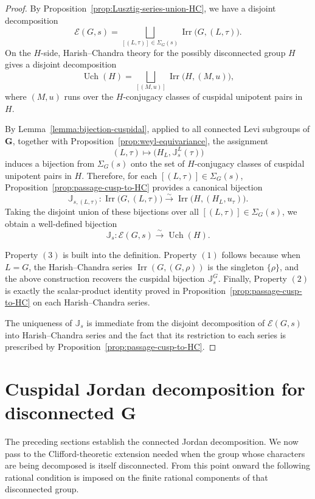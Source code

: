 \documentclass{amsart}
\theoremstyle{plain}
\numberwithin{equation}{section}
\theoremstyle{definition}
\newcommand{\cE}{\mathcal{E}}
\newcommand{\Irr}{\operatorname{Irr}}
\newcommand{\Uch}{\operatorname{Uch}}
\newcommand{\J}{\mathbb{J}}
\newcommand{\bG}{\mathbf{G}}
\begin{document}
\begin{proof}
By Proposition~\ref{prop:Lusztig-series-union-HC}, we have a disjoint decomposition
\[
\cE(G,s)
=
\bigsqcup_{[(L,\tau)]\in \Sigma_G(s)}
\Irr\bigl(G,(L,\tau)\bigr).
\]
On the \(H\)-side, Harish--Chandra theory for the possibly disconnected group \(H\)
gives a disjoint decomposition
\[
\Uch(H)
=
\bigsqcup_{[(M,u)]}
\Irr\bigl(H,(M,u)\bigr),
\]
where \((M,u)\) runs over the \(H\)-conjugacy classes of cuspidal unipotent pairs in
\(H\).

By Lemma~\ref{lemma:bijection-cuspidal}, applied to all connected Levi subgroups of
\(\bG\), together with Proposition~\ref{prop:weyl-equivariance}, the assignment
\[
(L,\tau)\longmapsto \bigl(H_L,\J_s^L(\tau)\bigr)
\]
induces a bijection from \(\Sigma_G(s)\) onto the set of \(H\)-conjugacy classes of
cuspidal unipotent pairs in \(H\). Therefore, for each
\([(L,\tau)]\in \Sigma_G(s)\), Proposition~\ref{prop:passage-cusp-to-HC} provides a
canonical bijection
\[
\J_{s,(L,\tau)}:\Irr\bigl(G,(L,\tau)\bigr)\xrightarrow{\sim}
\Irr\bigl(H,(H_L,u_\tau)\bigr).
\]
Taking the disjoint union of these bijections over all
\([(L,\tau)]\in \Sigma_G(s)\), we obtain a well-defined bijection
\[
\J_s:\cE(G,s)\xrightarrow{\sim}\Uch(H).
\]

Property \((3)\) is built into the definition. Property \((1)\) follows because when
\(L=G\), the Harish--Chandra series \(\Irr(G,(G,\rho))\) is the singleton
\(\{\rho\}\), and the above construction recovers the cuspidal bijection
\(\J_s^G\). Finally, Property \((2)\) is exactly the scalar-product identity proved in
Proposition~\ref{prop:passage-cusp-to-HC} on each Harish--Chandra series.

The uniqueness of \(\J_s\) is immediate from the disjoint decomposition of
\(\cE(G,s)\) into Harish--Chandra series and the fact that its restriction to each
series is prescribed by Proposition~\ref{prop:passage-cusp-to-HC}.
\end{proof}

\section{Cuspidal Jordan decomposition for disconnected $\bG$}\label{sec:cuspidal-JD-disconnected}
The preceding sections establish the connected Jordan decomposition.  We now
pass to the Clifford-theoretic extension needed when the group whose characters
are being decomposed is itself disconnected.  From this point onward the
following rational condition is imposed on the finite rational components of
that disconnected group.
\end{document}
